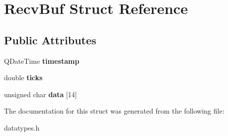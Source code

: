 \hypertarget{struct_recv_buf}{}\section{Recv\+Buf Struct Reference}
\label{struct_recv_buf}
\subsection*{Public Attributes}
\begin{DoxyCompactItemize}
\item 
\hypertarget{struct_recv_buf_a783259ad8d6e01768b7cec5e2e2522a0}{}Q\+Date\+Time {\bfseries timestamp}\label{struct_recv_buf_a783259ad8d6e01768b7cec5e2e2522a0}

\item 
\hypertarget{struct_recv_buf_a168ca83cef7dbeccfa3aa5a758e5d0d8}{}double {\bfseries ticks}\label{struct_recv_buf_a168ca83cef7dbeccfa3aa5a758e5d0d8}

\item 
\hypertarget{struct_recv_buf_ae3ba4d4624a4c1b2e14234293f1ad76b}{}unsigned char {\bfseries data} \mbox{[}14\mbox{]}\label{struct_recv_buf_ae3ba4d4624a4c1b2e14234293f1ad76b}

\end{DoxyCompactItemize}


The documentation for this struct was generated from the following file\+:\begin{DoxyCompactItemize}
\item 
datatypes.\+h\end{DoxyCompactItemize}
